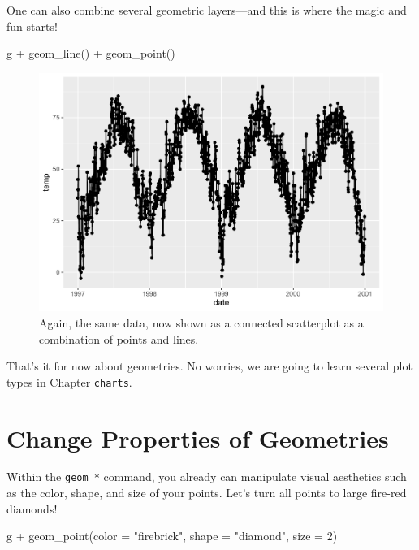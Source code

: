 \documentclass[
]{krantz}
\makeatletter
\newenvironment{Shaded}{\begin{snugshade}}{\end{snugshade}}
\newcommand{\AttributeTok}[1]{\textcolor[rgb]{0.61,0.61,0.61}{#1}}
\newcommand{\DecValTok}[1]{\textcolor[rgb]{0.06,0.06,0.06}{#1}}
\newcommand{\FunctionTok}[1]{\textcolor[rgb]{0,0,0}{#1}}
\newcommand{\NormalTok}[1]{#1}
\newcommand{\SpecialCharTok}[1]{\textcolor[rgb]{0,0,0}{#1}}
\newcommand{\StringTok}[1]{\textcolor[rgb]{0.5,0.5,0.5}{#1}}
\newenvironment{kframe}{%
\medskip{}
\setlength{\fboxsep}{.8em}
 \def\at@end@of@kframe{}%
 \ifinner\ifhmode%
  \def\at@end@of@kframe{\end{minipage}}%
  \begin{minipage}{\columnwidth}%
 \fi\fi%
 \def\FrameCommand##1{\hskip\@totalleftmargin \hskip-\fboxsep
 \colorbox{shadecolor}{##1}\hskip-\fboxsep
     \hskip-\linewidth \hskip-\@totalleftmargin \hskip\columnwidth}%
 \MakeFramed {\advance\hsize-\width
   \@totalleftmargin\z@ \linewidth\hsize
   \@setminipage}}%
 {\par\unskip\endMakeFramed%
 \at@end@of@kframe}
\renewenvironment{Shaded}{\begin{kframe}}{\end{kframe}}
\makeatother
\begin{document}
One can also combine several geometric layers---and this is where the magic and fun starts!

\begin{Shaded}
\begin{Highlighting}[]
\NormalTok{g }\SpecialCharTok{+} \FunctionTok{geom\_line}\NormalTok{() }\SpecialCharTok{+} \FunctionTok{geom\_point}\NormalTok{()}
\end{Highlighting}
\end{Shaded}

\begin{figure}
\centering
\includegraphics{bookdown_files/figure-latex/ggplot-default-line-point-1.pdf}
\caption{\label{fig:ggplot-default-line-point}Again, the same data, now shown as a connected scatterplot as a combination of points and lines.}
\end{figure}

That's it for now about geometries. No worries, we are going to learn several plot types in Chapter \texttt{charts}.

\hypertarget{prop}{%
\section{Change Properties of Geometries}\label{prop}}

Within the \texttt{geom\_*} command, you already can manipulate visual aesthetics such as the color, shape, and size of your points. Let's turn all points to large fire-red diamonds!

\begin{Shaded}
\begin{Highlighting}[]
\NormalTok{g }\SpecialCharTok{+} \FunctionTok{geom\_point}\NormalTok{(}\AttributeTok{color =} \StringTok{"firebrick"}\NormalTok{, }\AttributeTok{shape =} \StringTok{"diamond"}\NormalTok{, }\AttributeTok{size =} \DecValTok{2}\NormalTok{)}
\end{Highlighting}
\end{Shaded}
\end{document}
